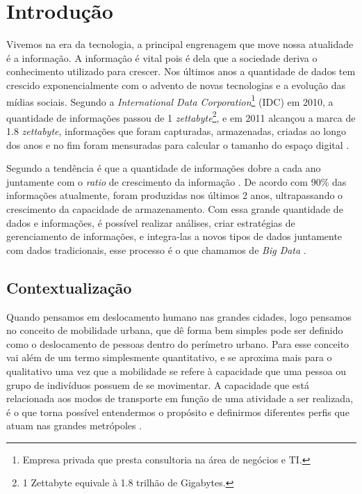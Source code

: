 \chapter[Introdução]{Introdução}

    Vivemos na era da tecnologia, a principal engrenagem que move nossa atualidade é a
    informação. A informação é vital pois é dela que a sociedade deriva o conhecimento
    utilizado para crescer. Nos últimos anos a quantidade de dados tem crescido
    exponencialmente com o advento de novas tecnologias e a evolução das mídias sociais.
    Segundo a \textit{International Data Corporation}\footnote{Empresa privada que presta
    consultoria na área de negócios e TI.} (IDC) em 2010, a quantidade de informações
    passou de 1 \textit{zettabyte}\footnote{1 Zettabyte equivale à 1.8 trilhão de
    Gigabytes.}, e em 2011 alcançou a marca de 1.8 \textit{zettabyte}, informações que
    foram capturadas, armazenadas, criadas ao longo dos anos e no fim foram mensuradas
    para calcular o tamanho do espaço digital \cite{gantz2011}.

    Segundo  a tendência é que a quantidade de informações dobre a
    cada ano juntamente com o \textit{ratio} de crescimento da informação . De acordo
    com  90\% das informações atualmente, foram produzidas nos
    últimos 2 anos, ultrapassando o crescimento da capacidade de armazenamento. Com
    essa grande quantidade de dados e informações, é possível realizar análises, criar
    estratégias de gerenciamento de informações, e integra-las a novos tipos de dados
    juntamente com dados tradicionais, esse processo é o que chamamos de \textit{Big
    Data} \cite{oracle2015}.

    \section{Contextualização}

        Quando pensamos em deslocamento humano nas grandes cidades, logo pensamos no
        conceito de mobilidade urbana, que dê forma bem simples pode ser definido como o
        deslocamento de pessoas dentro do perímetro urbano. Para 
        esse conceito vai além de um termo simplesmente quantitativo, e se aproxima mais para
        o qualitativo uma vez que a mobilidade se refere à capacidade que uma pessoa ou grupo
        de indivíduos possuem de se movimentar. A capacidade que está relacionada aos modos
        de transporte em função de uma atividade a ser realizada, é o que torna possível entendermos
        o propósito e definirmos diferentes perfis que atuam nas grandes metrópoles \cite{pontes2011}.

